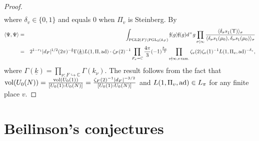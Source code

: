 \documentclass{amsart}
\theoremstyle{definition}
\theoremstyle{remark}
\numberwithin{equation}{section}
\newcommand{\PGL}{{\mathrm{PGL}}}
\newcommand{\A}{{\mathbb A}}
\newcommand{\C}{{\mathbb C}}
\begin{document}
\begin{proof}
\begin{eqnarray*}
\end{eqnarray*}
where $\delta_v\in\{0,1\}$ and equals 0 when $\Pi_v$ is Steinberg.
By \cite[Lemmas 4.12, 4.14, 4.29, and 4.30]{preprintsanti2}
\begin{eqnarray*}
    \langle\Psi,\Psi\rangle&=&\int_{\PGL2(F)\backslash \PGL_2(\A_F)}\mathfrak{f}(g)\mathfrak{f}(g)d^\times g\prod_{\sigma\mid\infty}\frac{\langle{\delta_\sigma s}_1(\Upsilon)\rangle_{\sigma}}{\langle{\delta_\sigma s}_1(\mu_0),{\delta_\sigma s}_1(\mu_0)\rangle_\sigma}\\
    &=&2^{1-r_1}|d_F|^{1/2}(2\pi)^{-\underline k}\Gamma(\underline k) L(1,\Pi,{\rm ad})\cdot \zeta_F(2)^{-1}\prod_{F_\sigma=\C}\frac{4\pi}{3}(-1)^{\frac{\underline k_\sigma}{2}}\prod_{v\nmid\infty,v\,{\rm ram.}}\zeta_v(2)\zeta_v(1)^{-1} L(1,\Pi_v,{\rm ad})^{-\delta_v},
\end{eqnarray*}
where $\Gamma({\underline k})=\prod_{\nu:F\hookrightarrow\C}\Gamma(k_\nu)$. The result follows from the fact that ${\rm vol}(U_0(N))=\frac{{\rm vol}(U_0(1))}{[U_0(1):U_0(N)]}=\frac{\zeta_F(2)^{-1}|d_F|^{-3/2}}{[U_0(1):U_0(N)]}$ and $L(1,\Pi_v,{\rm ad})\in L_\pi$ for any finite place $v$.
\end{proof}


\appendix
\section{Beilinson's conjectures}\label{ApdxBC}
\end{document}
